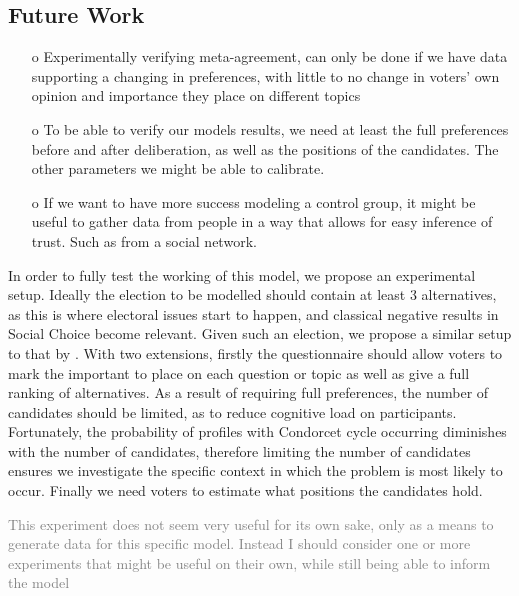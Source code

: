 \subsection{Future Work}


\begin{itemize}
	\item [o] Experimentally verifying meta-agreement, can only be done if we have data supporting a changing in preferences, with little to no change in voters' own opinion and importance they place on different topics
	\item[o] To be able to verify our models results, we need at least the full preferences before and after deliberation, as well as the positions of the candidates. The other parameters we might be able to calibrate.
	\item[o] If we want to have more success modeling a control group, it might be useful to gather data from people in a way that allows for easy inference of trust. Such as from a social network.
\end{itemize}


In order to fully test the working of this model, we propose an experimental
setup. Ideally the election to be modelled should contain at least 3
alternatives, as this is where electoral issues start to happen, and classical
negative results in Social Choice become relevant. Given such an election, we
propose a similar setup to that by \citet{fishkinCanDeliberationHave2024}. With
two extensions, firstly the questionnaire should allow voters to mark the
important to place on each question or topic as well as give a full ranking of
alternatives. As a result of requiring full preferences, the number of
candidates should be limited, as to reduce cognitive load on participants.
Fortunately, the probability of profiles with Condorcet cycle occurring
diminishes with the number of candidates, therefore limiting the number of
candidates ensures we investigate the specific context in which the problem is
most likely to occur. Finally we need voters to estimate what positions the candidates hold.

\textcolor{gray}{This experiment does not seem very useful for its own sake, only as a means to generate data for this specific model. Instead I should consider one or more experiments that might be useful on their own, while still being able to inform the model}
